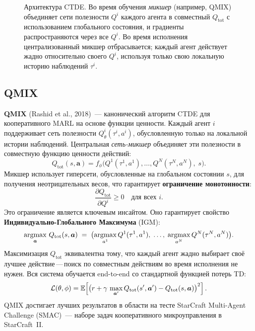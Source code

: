 \begin{figure}[ht]
\caption{Архитектура CTDE. Во время обучения \emph{микшер}
  (например, QMIX) объединяет сети полезности $Q^i$ каждого агента в
  совместный $Q_\mathrm{tot}$ с использованием глобального состояния, и градиенты
  распространяются через все $Q^i$. Во время исполнения централизованный микшер
  отбрасывается; каждый агент действует жадно относительно своего $Q^i$,
  используя только свою локальную историю наблюдений $\tau^i$.}
\label{fig:ctde}
\end{figure}

\subsection{QMIX}

\textbf{QMIX} (Rashid et al., 2018)~--- канонический алгоритм CTDE
для кооперативного MARL на основе функции ценности. Каждый
агент $i$ поддерживает сеть полезности
$Q^i_\theta(\tau^i, a^i)$, обусловленную только на локальной
истории наблюдений. Центральная \emph{сеть-микшер} объединяет эти
полезности в совместную функцию ценности действий:
\begin{equation}
\label{eq:qmix}
Q_\mathrm{tot}(s, \bm{a}) = f_\phi\!\bigl(Q^1(\tau^1, a^1), \ldots,
  Q^N(\tau^N, a^N),\; s\bigr).
\end{equation}
Микшер использует гиперсети, обусловленные на
глобальном состоянии $s$, для получения неотрицательных весов, что гарантирует
\textbf{ограничение монотонности}:
\[
  \frac{\partial Q_\mathrm{tot}}{\partial Q^i} \geq 0
  \quad \text{для всех } i.
\]
Это ограничение является ключевым инсайтом. Оно гарантирует
свойство \textbf{Индивидуально-Глобального Максимума} (IGM):
\[
  \operatorname*{argmax}_{\bm{a}}\, Q_\mathrm{tot}(s, \bm{a})
  \;=\; \bigl(\operatorname*{argmax}_{a^1} Q^1(\tau^1, a^1),\; \ldots,\;
               \operatorname*{argmax}_{a^N} Q^N(\tau^N, a^N)\bigr).
\]
Максимизация $Q_\mathrm{tot}$ эквивалентна тому, что каждый агент
жадно выбирает своё лучшее действие\,---\,поиск по совместным действиям
во время исполнения не нужен. Вся система обучается end-to-end
со стандартной функцией потерь TD:
\begin{equation}
\label{eq:qmix-loss}
\mathcal{L}(\theta, \phi) = \operatorname{\mathbb{E}}\!\left[
  \bigl(r + \gamma\, \max_{\bm{a}'} Q_\mathrm{tot}(s', \bm{a}')
  - Q_\mathrm{tot}(s, \bm{a})\bigr)^2
\right].
\end{equation}
QMIX достигает лучших результатов в области на тесте StarCraft
Multi-Agent Challenge (SMAC)~--- наборе задач кооперативного
микроуправления в StarCraft~II.

